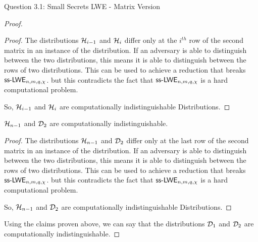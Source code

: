 \begin{solution}{Question 3.1: Small Secrets LWE - Matrix Version}
\begin{proof}
    \begin{proof}
        The distributions $\mathcal{H}_{i-1}$ and $\mathcal{H}_i$ differ only at the $i^{th}$ row of the second matrix in an instance of the distribution. If an adversary is able to distinguish between the two distributions, this means it is able to distinguish between the rows of two distributions. This can be used to achieve a reduction that breaks $\mathsf{ss\text{-}LWE}_{n,m,q,\chi}$. but this contradicts the fact that $\mathsf{ss\text{-}LWE}_{n,m,q,\chi}$ is a hard computational problem.

        So, $\mathcal{H}_{i-1}$ and $\mathcal{H}_i$ are computationally indistinguishable Distributions.
        
    \end{proof}

    \begin{claim}
    $\mathcal{H}_{n-1}$ and $\mathcal{D}_2$ are computationally indistinguishable.
    \end{claim}

    \begin{proof}
    The distributions $\mathcal{H}_{n-1}$ and $\mathcal{D}_2$ differ only at the last row of the second matrix in an instance of the distribution. If an adversary is able to distinguish between the two distributions, this means it is able to distinguish between the rows of two distributions. This can be used to achieve a reduction that breaks $\mathsf{ss\text{-}LWE}_{n,m,q,\chi}$. but this contradicts the fact that $\mathsf{ss\text{-}LWE}_{n,m,q,\chi}$ is a hard computational problem.

        So, $\mathcal{H}_{n-1}$ and $\mathcal{D}_2$ are computationally indistinguishable Distributions.
        
    \end{proof}

    Using the claims proven above, we can say that the distributions $\mathcal{D}_1$ and $\mathcal{D}_2$ are computationally indistinguishable.
    
    \end{proof}
\end{solution}
